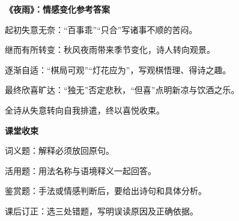\documentclass[UTF8,10pt,aspectratio=169]{ctexbeamer}
\newcommand{\PageHeading}[1]{\begin{center}{\Large\bfseries #1}\end{center}\vspace{0.2cm}}
\begin{document}
\begin{frame}
\PageHeading{《夜雨》：情感变化参考答案}
起初失意无奈：“百事乖”“只合”写诸事不顺的苦闷。\par\vspace{0.23cm}
继而有所转变：秋风夜雨带来季节变化，诗人转向观景。\par\vspace{0.23cm}
逐渐自适：“棋局可观”“灯花应为”，写观棋悟理、得诗之趣。\par\vspace{0.23cm}
最终欣喜旷达：“独无”否定悲秋，“但喜”点明新凉与饮酒之乐。\par\vspace{0.23cm}
全诗从失意转向自我排遣，终以喜悦收束。\par\vspace{0.23cm}
\end{frame}
\begin{frame}
\PageHeading{课堂收束}
词义题：解释必须放回原句。\par\vspace{0.23cm}
活用题：用法名称与语境释义一起回答。\par\vspace{0.23cm}
鉴赏题：手法或情感判断后，要给出诗句和具体分析。\par\vspace{0.23cm}
课后订正：选三处错题，写明误读原因及正确依据。\par\vspace{0.23cm}
\end{frame}
\end{document}
